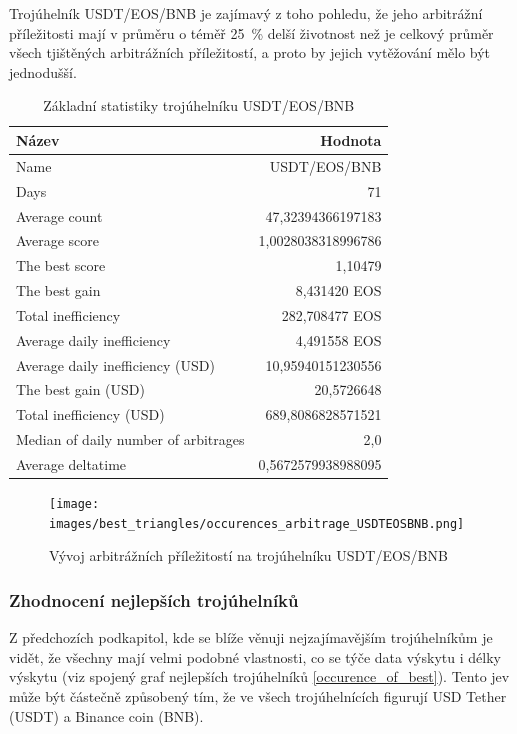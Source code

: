 \documentclass[thesis=B,czech]{FITthesis}[2019/03/21]
\begin{document}
Trojúhelník USDT/EOS/BNB je zajímavý z toho pohledu, že jeho arbitrážní příležitosti mají v průměru o téměř 25~\% delší životnost než je celkový průměr všech tjištěných arbitrážních příležitostí, a proto by jejich vytěžování mělo být jednodušší.


\begin{table}\centering
\caption{Základní statistiky trojúhelníku USDT/EOS/BNB}
\label{USDTEOSBNB_stats}
\begin{tabular}{|| l | r ||}
\hline Název & Hodnota \\ 
\hline\hline Name & USDT/EOS/BNB \\ 
\hline Days & 71 \\ 
\hline Average count & 47,32394366197183 \\ 
\hline Average score & 1,0028038318996786 \\ 
\hline The best score & 1,10479 \\ 
\hline The best gain & 8,431420 EOS \\ 
\hline Total inefficiency & 282,708477 EOS \\ 
\hline Average daily inefficiency & 4,491558 EOS \\ 
\hline Average daily inefficiency (USD) & 10,95940151230556 \\ 
\hline The best gain (USD) & 20,5726648 \\ 
\hline Total inefficiency (USD) & 689,8086828571521 \\ 
\hline Median of daily number of arbitrages & 2,0 \\ 
\hline Average deltatime & 0,5672579938988095 \\ 
\hline
\end{tabular}
\end{table}

\begin{figure}\centering
	\texttt{[image: images/best\_triangles/occurences\_arbitrage\_USDTEOSBNB.png]}
	\caption{Vývoj arbitrážních příležitostí na trojúhelníku USDT/EOS/BNB }\label{occurences_arbitrage_USDTEOSBNB}
\end{figure}
\subsubsection{Zhodnocení nejlepších trojúhelníků}

Z předchozích podkapitol, kde se blíže věnuji nejzajímavějším trojúhelníkům je vidět, že všechny mají velmi podobné vlastnosti, co se týče data výskytu i délky výskytu (viz spojený graf nejlepších trojúhelníků \ref{occurence_of_best}). Tento jev může být částečně způsobený tím, že ve všech trojúhelnících figurují USD Tether (USDT) a Binance coin (BNB). 
\end{document}
